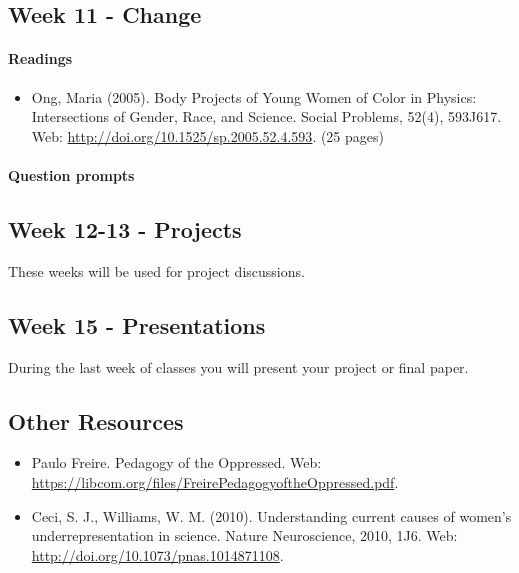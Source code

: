 \documentclass{article}
\begin{document}
\subsection{Week 11 - Change}
\paragraph{Readings}
\begin{itemize}
\item Ong, Maria (2005). Body Projects of Young Women of Color in Physics: Intersections of Gender, Race, and Science. Social Problems, 52(4), 593J617. Web: \url{http://doi.org/10.1525/sp.2005.52.4.593}. (25 pages)
\end{itemize}
\paragraph{Question prompts}


\subsection{Week 12-13 - Projects}
These weeks will be used for project discussions.


\subsection{Week 15 - Presentations}
During the last week of classes you will present your project or final paper.


\subsection*{Other Resources}
\begin{itemize}
\item Paulo Freire. Pedagogy of the Oppressed. Web: \url{https://libcom.org/files/FreirePedagogyoftheOppressed.pdf}.
\item Ceci, S. J., Williams, W. M. (2010). Understanding current causes of women's  underrepresentation in science. Nature Neuroscience, 2010, 1J6. Web: \url{http://doi.org/10.1073/pnas.1014871108}.
\end{itemize}
\end{document}
